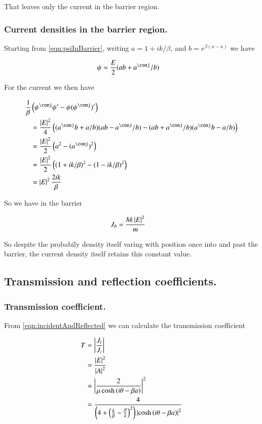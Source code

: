 \documentclass{article}
\begin{document}
That leaves only the current in the barrier region.

\subsubsection{ Current densities in the barrier region. }

Starting from \ref{eqn:psiInBarrier}, writing $a = 1 + ik/\beta$, and $b=e^{\beta(x-a)}$ we have

\begin{align*}
\psi &= \frac{E}{2} (a b + a^\conj/b)
\end{align*}

For the current we then have

\begin{align*}
\inv{\beta}&\left(\psi^\conj \psi' - \psi (\psi^\conj)' \right) \\
&=
\frac{\Abs{E}^2}{4}
\left(
(a^\conj b + a/b) (a b - a^\conj/b)
-(a b + a^\conj/b) (a^\conj b - a/b)
\right) \\
&=
\frac{\Abs{E}^2}{2} \left(a^2 - (a^\conj)^2 \right) \\
&=
\frac{\Abs{E}^2}{2} \left( 
(1 + ik/\beta)^2
-(1 - ik/\beta)^2
 \right) \\
&=
\Abs{E}^2 \frac{2ik}{\beta}
\end{align*}

So we have in the barrier

\begin{align*}
J_b 
&=
\frac{\hbar k \left\lvert{E}\right\rvert^2 }{m}
\end{align*}

So despite the probabily density itself varing with position once into and past the barrier, the current density itself
retains this
constant value.

\subsection{ Transmission and reflection coefficients. }

\subsubsection{ Transmission coefficient. }

From \ref{eqn:incidentAndReflected} we can calculate the transmission
coefficient

\begin{align*}
T 
&= \left\lvert{\frac{J_t}{J_i}}\right\rvert \\
&= \frac{\left\lvert{E}\right\rvert^2}{\left\lvert{A}\right\rvert^2} \\
&= \left\lvert{\frac{2  } { \mu \cosh\left( i\theta -\beta a \right) }}\right\rvert^2 \\
&= \frac{4} { 
\left(4 + \left( \frac{k}{\beta} -\frac{\beta}{k} \right)^2 \right)
\left\lvert{\cosh\left( i\theta -\beta a \right)}\right\rvert^2 }
\end{align*}
\end{document}
